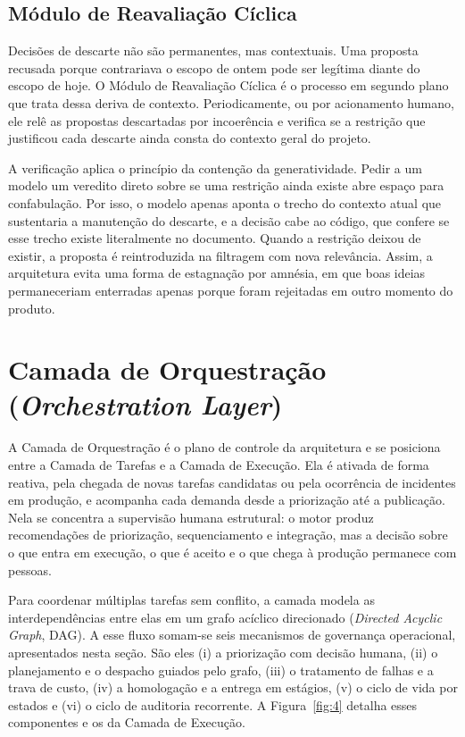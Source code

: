 \subsection{Módulo de Reavaliação Cíclica}\label{sec:4.3.5}

Decisões de descarte não são permanentes, mas contextuais. Uma proposta recusada porque contrariava o escopo de ontem pode ser legítima diante do escopo de hoje. O Módulo de Reavaliação Cíclica é o processo em segundo plano que trata dessa deriva de contexto. Periodicamente, ou por acionamento humano, ele relê as propostas descartadas por incoerência e verifica se a restrição que justificou cada descarte ainda consta do contexto geral do projeto.

A verificação aplica o princípio da contenção da generatividade. Pedir a um modelo um veredito direto sobre se uma restrição ainda existe abre espaço para confabulação. Por isso, o modelo apenas aponta o trecho do contexto atual que sustentaria a manutenção do descarte, e a decisão cabe ao código, que confere se esse trecho existe literalmente no documento. Quando a restrição deixou de existir, a proposta é reintroduzida na filtragem com nova relevância. Assim, a arquitetura evita uma forma de estagnação por amnésia, em que boas ideias permaneceriam enterradas apenas porque foram rejeitadas em outro momento do produto.

\section[Camada de Orquestração (Orchestration Layer)]{Camada de Orquestração (\textit{Orchestration Layer})}\label{sec:4.4}

A Camada de Orquestração é o plano de controle da arquitetura e se posiciona entre a Camada de Tarefas e a Camada de Execução. Ela é ativada de forma reativa, pela chegada de novas tarefas candidatas ou pela ocorrência de incidentes em produção, e acompanha cada demanda desde a priorização até a publicação. Nela se concentra a supervisão humana estrutural: o motor produz recomendações de priorização, sequenciamento e integração, mas a decisão sobre o que entra em execução, o que é aceito e o que chega à produção permanece com pessoas.

Para coordenar múltiplas tarefas sem conflito, a camada modela as interdependências entre elas em um grafo acíclico direcionado (\textit{Directed Acyclic Graph}, DAG). A esse fluxo somam-se seis mecanismos de governança operacional, apresentados nesta seção. São eles (i) a priorização com decisão humana, (ii) o planejamento e o despacho guiados pelo grafo, (iii) o tratamento de falhas e a trava de custo, (iv) a homologação e a entrega em estágios, (v) o ciclo de vida por estados e (vi) o ciclo de auditoria recorrente. A Figura~\ref{fig:4} detalha esses componentes e os da Camada de Execução.

